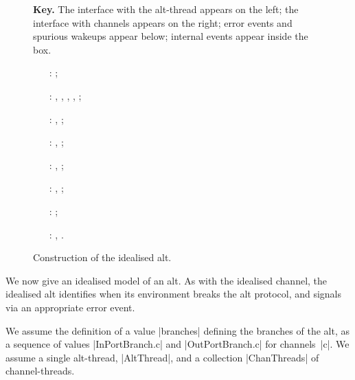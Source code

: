\begin{figure}[thbp]

\textbf{Key.} The interface with the alt-thread appears on the left; the
interface with channels appears on the right; error events and spurious
wakeups appear below; internal events appear inside the box.  

\raggedright
%
\begin{itemize}
\item[\inCircle{1}:] \m{};

\item[\inCircle{2}:] , ,
  \m{}, ,
  ; 

\item[\inCircle{3}:] \m{}, ;

\item[\inCircle{4}:] \m{}\m{},
  \m{}; 

\item[\inCircle{5}:] \m{},
  \m{};   

\item[\inCircle{6}:] \m{},
  \m{};   

\item[\inCircle{7}:] ; 

\item[\inCircle{8}:] \m{}, 
  .

\end{itemize}
%
\caption{Construction of the idealised alt.  \label{fig:idealised-alt}}
\end{figure}


We now give an idealised model of an alt.  As with the idealised channel, the
idealised alt identifies when its environment breaks the alt protocol, and
signals via an appropriate error event.  

We assume the definition of a value |branches| defining the branches of the
alt, as a sequence of values |InPortBranch.c| and |OutPortBranch.c| for
channels~|c|.  We assume a single alt-thread, |AltThread|, and a collection
|ChanThreads| of channel-threads.

